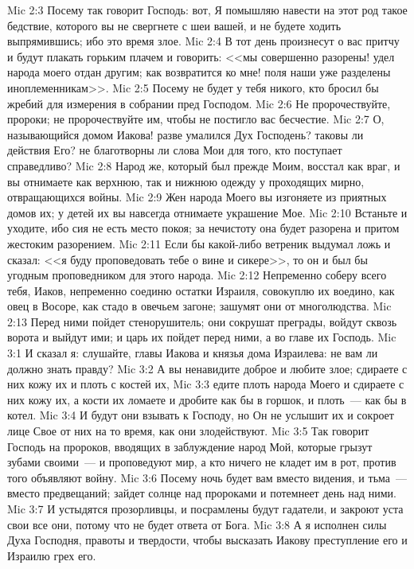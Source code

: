 \vs Mic 2:3 Посему так говорит Господь: вот, Я помышляю навести на этот род такое бедствие, которого вы не свергнете с шеи вашей, и не будете ходить выпрямившись; ибо это время злое.
\vs Mic 2:4 В тот день произнесут о вас притчу и будут плакать горьким плачем и говорить: <<мы совершенно разорены! удел народа моего отдан другим; как возвратится ко мне! поля наши уже разделены иноплеменникам>>.
\vs Mic 2:5 Посему не будет у тебя никого, кто бросил бы жребий для измерения в собрании пред Господом.
\vs Mic 2:6 Не пророчествуйте, пророки; не пророчествуйте им, чтобы не постигло вас бесчестие.
\vs Mic 2:7 О, называющийся домом Иакова! разве умалился Дух Господень? таковы ли действия Его? не благотворны ли слова Мои для того, кто поступает справедливо?
\vs Mic 2:8 Народ же, который был прежде Моим, восстал как враг, и вы отнимаете как верхнюю, так и нижнюю одежду у проходящих мирно, отвращающихся войны.
\vs Mic 2:9 Жен народа Моего вы изгоняете из приятных домов их; у детей их вы навсегда отнимаете украшение Мое.
\vs Mic 2:10 Встаньте и уходите, ибо  сия не есть место покоя; за нечистоту она будет разорена и притом жестоким разорением.
\vs Mic 2:11 Если бы какой-либо ветреник выдумал ложь и сказал: <<я буду проповедовать тебе о вине и сикере>>, то он и был бы угодным проповедником для этого народа.
\vs Mic 2:12 Непременно соберу всего тебя, Иаков, непременно соединю остатки Израиля, совокуплю их воедино, как овец в Восоре, как стадо в овечьем загоне; зашумят они от многолюдства.
\vs Mic 2:13 Перед ними пойдет стенорушитель; они сокрушат преграды, войдут сквозь ворота и выйдут ими; и царь их пойдет перед ними, а во главе их Господь.
\vs Mic 3:1 И сказал я: слушайте, главы Иакова и князья дома Израилева: не вам ли должно знать правду?
\vs Mic 3:2 А вы ненавидите доброе и любите злое; сдираете с них кожу их и плоть с костей их,
\vs Mic 3:3 едите плоть народа Моего и сдираете с них кожу их, а кости их ломаете и дробите как бы в горшок, и плоть~--- как бы в котел.
\vs Mic 3:4 И будут они взывать к Господу, но Он не услышит их и сокроет лице Свое от них на то время, как они злодействуют.
\vs Mic 3:5 Так говорит Господь на пророков, вводящих в заблуждение народ Мой, которые грызут зубами своими~--- и проповедуют мир, а кто ничего не кладет им в рот, против того объявляют войну.
\vs Mic 3:6 Посему ночь будет вам вместо видения, и тьма~--- вместо предвещаний; зайдет солнце над пророками и потемнеет день над ними.
\vs Mic 3:7 И устыдятся прозорливцы, и посрамлены будут гадатели, и закроют уста свои все они, потому что не будет ответа от Бога.
\vs Mic 3:8 А я исполнен силы Духа Господня, правоты и твердости, чтобы высказать Иакову преступление его и Израилю грех его.
